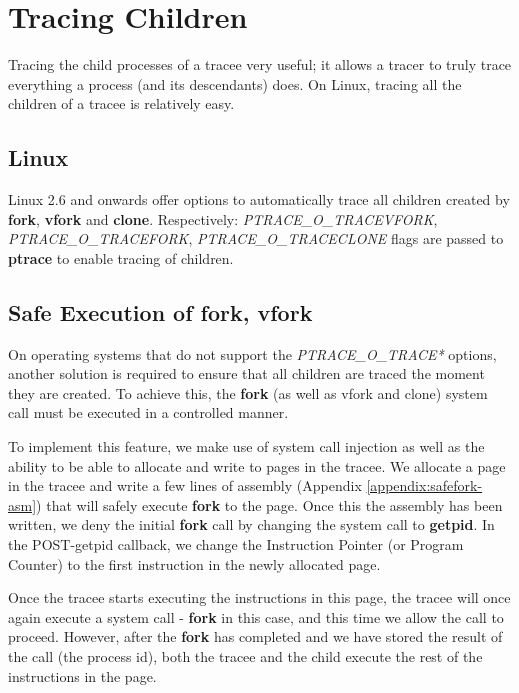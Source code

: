 \documentclass[a4paper, 10pt]{report}
\begin{document}
\section{Tracing Children}

Tracing the child processes of a tracee very useful; it allows a tracer to truly
trace everything a process (and its descendants) does. On Linux, tracing all the
children of a tracee is relatively easy.

\subsection{Linux}

Linux 2.6 and onwards offer options to automatically trace all children
created by \textbf{fork}, \textbf{vfork} and \textbf{clone}.
Respectively: \textit{PTRACE\_O\_TRACEVFORK}, \textit{PTRACE\_O\_TRACEFORK},
\textit{PTRACE\_O\_TRACECLONE} flags are passed to \textbf{ptrace} to enable
tracing of children.

\subsection{Safe Execution of fork, vfork}
\label{safe-fork}

On operating systems that do not support the \textit{PTRACE\_O\_TRACE*} options,
another solution is required to ensure that all children are traced the moment
they are created. To achieve this, the \textbf{fork}
(as well as vfork and clone) system call must be executed in a
controlled manner.

To implement this feature, we make use of system call injection as well as the
ability to be able to allocate and write to pages in the tracee. We allocate a
page in the tracee and write a few lines of assembly (Appendix
\ref{appendix:safefork-asm}) that will safely execute
\textbf{fork} to the page.
Once this the assembly has been written, we deny the initial
\textbf{fork} call by changing the system call to \textbf{getpid}.
In the POST-getpid callback, we change the Instruction Pointer
(or Program Counter) to the first instruction in the newly allocated page.

Once the tracee starts executing the instructions in this
page, the tracee will once again execute a system call -
\textbf{fork} in this case, and this time we allow the call to proceed.
However, after the \textbf{fork} has completed
and we have stored the result of the call (the process id), both the tracee
and the child execute the rest of the instructions in the page.
\end{document}
